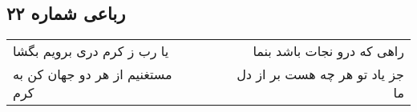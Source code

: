 \begin{center}
\section*{رباعی شماره ۲۲}
\label{sec:sh022}
\begin{longtable}{l p{0.5cm} r}
یا رب ز کرم دری برویم بگشا
&&
راهی که درو نجات باشد بنما
\\
مستغنیم از هر دو جهان کن به کرم
&&
جز یاد تو هر چه هست بر از دل ما
\\
\end{longtable}
\end{center}
